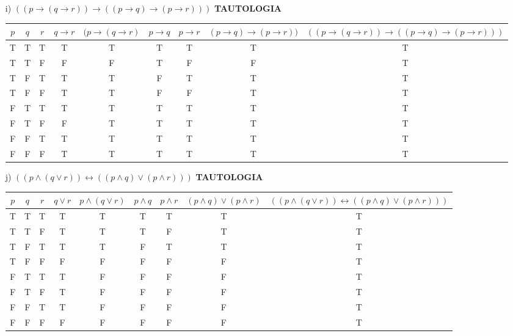 \documentclass[10pt,a4paper]{article}
\begin{document}
\begin{enumerate}
\item[i)]$((p \rightarrow (q \rightarrow r)) \rightarrow ((p \rightarrow q) \rightarrow (p \rightarrow r)))$ \textbf{TAUTOLOGIA}

\begin{tabular}{|c|c|c|c|c|c|c|c|c|}
\hline
$p$ & $q$ & $r$ & $q \rightarrow r$ & $(p \rightarrow (q \rightarrow r)$ & $p \rightarrow q$ & $p \rightarrow r$ & $(p \rightarrow q) \rightarrow (p \rightarrow r))$ & $((p \rightarrow (q \rightarrow r)) \rightarrow ((p \rightarrow q) \rightarrow (p \rightarrow r)))$ \\ \hline
T  & T & T & T & T & T & T & T & T\\
T  & T & F & F & F & T & F & F & T\\
T  & F & T & T & T & F & T & T & T\\
T  & F & F & T & T & F & F & T & T\\
F  & T & T & T & T & T & T & T & T\\
F  & T & F & F & T & T & T & T & T\\
F  & F & T & T & T & T & T & T & T\\
F  & F & F & T & T & T & T & T & T\\ \hline
\end{tabular}

\item[j)]$((p \wedge (q \vee r)) \leftrightarrow ((p \wedge q) \vee (p \wedge r)))$ \textbf{TAUTOLOGIA}

\begin{tabular}{|c|c|c|c|c|c|c|c|c|}
\hline
$p$ & $q$ & $r$ & $q \vee r$ & $p \wedge (q \vee r)$ & $p \wedge q$ & $p \wedge r$ & $(p \wedge q) \vee (p \wedge r)$ & $((p \wedge (q \vee r)) \leftrightarrow ((p \wedge q) \vee (p \wedge r)))$ \\ \hline
T  & T & T & T & T & T & T & T & T\\
T  & T & F & T & T & T & F & T & T\\
T  & F & T & T & T & F & T & T & T\\
T  & F & F & F & F & F & F & F & T\\
F  & T & T & T & F & F & F & F & T\\
F  & T & F & T & F & F & F & F & T\\
F  & F & T & T & F & F & F & F & T\\
F  & F & F & F & F & F & F & F & T\\ \hline
\end{tabular}

\end{enumerate}
\end{document}

